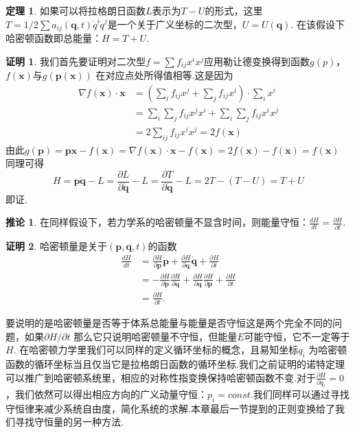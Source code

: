 \documentclass[UTF8,10.5pt,a4paper]{ctexart}
\numberwithin{equation}{section}
\theoremstyle{definition}
\newtheorem{thm}{定理\hspace{0.05pt}}[section]
\newtheorem{cor}{推论\hspace{0.05pt}}[section]
\theoremstyle{definition}
\newtheorem*{pf}{证明}
\begin{document}
\begin{thm}
如果可以将拉格朗日函数$L$表示为$T-U$的形式，这里$T=1/2\sum a_{ij}(\textbf{q},t)\dot{q}^i\dot{q}^j$是一个关于广义坐标的二次型，$U=U(\textbf{q})$.
在该假设下哈密顿函数即总能量：$H=T+U$.
\end{thm}
\begin{pf}
我们首先要证明对二次型$f=\sum f_{ij}x^ix^j$应用勒让德变换得到函数$g(p)$，$f(\textbf{x})$与$g(\textbf{p}(\textbf{x}))$ 在对应点处所得值相等.这是因为
\begin{align*}
\nabla f(\textbf{x})\cdot \mathbf{x}&=(\sum\limits_if_{ij}x^j+\sum\limits_jf_{ij}x^i)\cdot\sum\limits_ix^i\\
&=\sum\limits_i\sum\limits_jf_{ij}x^jx^i+\sum\limits_i\sum\limits_jf_{ij}x^ix^j\\
&=2\sum\limits_{ij}f_{ij}x^ix^j=2f(\textbf{x})
\end{align*}
由此$g(\textbf{p})=\textbf{p}\textbf{x}-f(\textbf{x})=\nabla f(\textbf{x})\cdot\textbf{x}-f(\textbf{x})=2f(\textbf{x})-f(\textbf{x})=f(\textbf{x})$\\
同理可得
$$H=\textbf{p}\dot{\textbf{q}}-L=\frac{\partial L}{\partial \dot{\textbf{q}}}-L=\frac{\partial T}{\partial \dot{\textbf{q}}}-L=2T-(T-U)=T+U$$
即证.
\end{pf}
\begin{cor}
在同样假设下，若力学系的哈密顿量不显含时间，则能量守恒：$\frac{dH}{dt}=\frac{\partial H}{\partial t}$.
\end{cor}
\begin{pf}
哈密顿量是关于$(\textbf{p},\textbf{q},t)$的函数
\begin{align*}
\frac{dH}{dt}&=\frac{\partial H}{\partial \textbf{p}}\dot{\textbf{p}}+\frac{\partial H}{\partial \textbf{q}}\dot{\textbf{q}}+\frac{\partial H}{\partial t}\\
&=-\frac{\partial H}{\partial \textbf{p}}\frac{\partial H}{\partial \textbf{q}}+\frac{\partial H}{\partial \textbf{q}}\frac{\partial H}{\partial \textbf{p}}+\frac{\partial H}{\partial t}\\
&=\frac{\partial H}{\partial t}.
\end{align*}
\end{pf}
要说明的是哈密顿量是否等于体系总能量与能量是否守恒这是两个完全不同的问题，如果$\partial H/\partial t$ 那么它只说明哈密顿量不守恒，但能量$E$可能守恒，它不一定等于$H$.
在哈密顿力学里我们可以同样的定义循环坐标的概念，且易知坐标$q_i$ 为哈密顿 函数的循环坐标当且仅当它是拉格朗日函数的循环坐标.我们之前证明的诺特定理可以推广到哈密顿系统里，相应的对称性指变换保持哈密顿函数不变.对于$\frac{\partial H}{\partial q_i}=0$，我们依然可以得出相应方向的广义动量守恒：$p_i=const$.我们同样可以通过寻找守恒律来减少系统自由度，简化系统的求解.本章最后一节提到的正则变换给了我们寻找守恒量的另一种方法.
\end{document}
